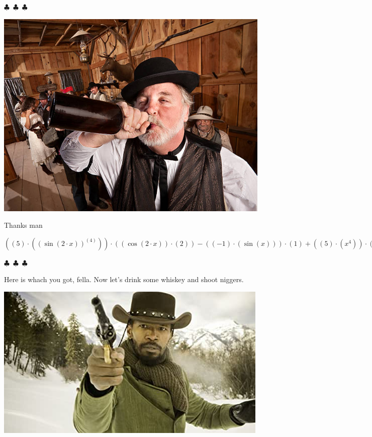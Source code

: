 \documentclass{article}
\begin{document}
\begin{center} $\clubsuit$~$\clubsuit$~$\clubsuit$ \end{center}\begin{center}  \includegraphics[scale=1.4]{funny_pics/drunk_cowboy.jpg} \end{center}Thanks man
\begin{center}$
{{{{({{({5})}\cdot{({{({\sin{({{2}\cdot{x}})}})}^{({4})}})}})}\cdot{({{({\cos{({{2}\cdot{x}})}})}\cdot{({2})}})}}-{{({{({-1})}\cdot{({\sin{({x})}})}})}\cdot{({1})}}}+{{({{({5})}\cdot{({{x}^{4}})}})}\cdot{({1})}}}
$\end{center}
\begin{center} $\clubsuit$~$\clubsuit$~$\clubsuit$ \end{center}Here is whach you got, fella. Now let's drink some whiskey and shoot niggers.\begin{center} \includegraphics[scale=0.6]{funny_pics/slave.jpg} \end{center}
\end{document}
